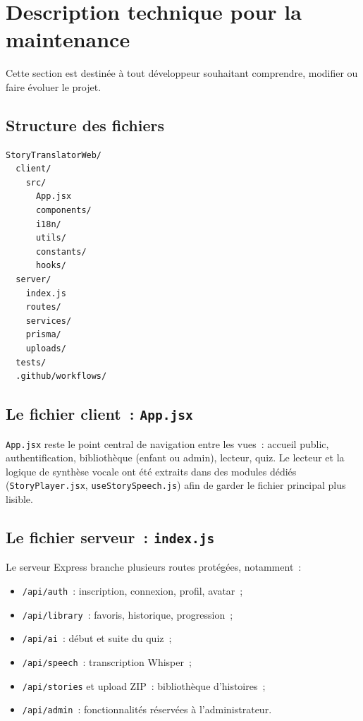 \documentclass[12pt,twoside,letterpaper]{article}
\begin{document}
\newpage

\section{Description technique pour la maintenance}
\label{sec:maintenance}

Cette section est destinée à tout développeur souhaitant comprendre, modifier ou faire évoluer le projet.

\subsection{Structure des fichiers}

\begin{verbatim}
StoryTranslatorWeb/
  client/
    src/
      App.jsx
      components/
      i18n/
      utils/
      constants/
      hooks/
  server/
    index.js
    routes/
    services/
    prisma/
    uploads/
  tests/
  .github/workflows/
\end{verbatim}

\subsection{Le fichier client~: \texttt{App.jsx}}
\texttt{App.jsx} reste le point central de navigation entre les vues~: accueil public, authentification, bibliothèque (enfant ou admin), lecteur, quiz.
Le lecteur et la logique de synthèse vocale ont été extraits dans des modules dédiés (\texttt{StoryPlayer.jsx}, \texttt{useStorySpeech.js}) afin de garder le fichier principal plus lisible.

\subsection{Le fichier serveur~: \texttt{index.js}}
Le serveur Express branche plusieurs routes protégées, notamment~:
\begin{itemize}
    \item \texttt{/api/auth}~: inscription, connexion, profil, avatar~;
    \item \texttt{/api/library}~: favoris, historique, progression~;
    \item \texttt{/api/ai}~: début et suite du quiz~;
    \item \texttt{/api/speech}~: transcription Whisper~;
    \item \texttt{/api/stories} et upload ZIP~: bibliothèque d'histoires~;
    \item \texttt{/api/admin}~: fonctionnalités réservées à l'administrateur.
\end{itemize}
\end{document}
